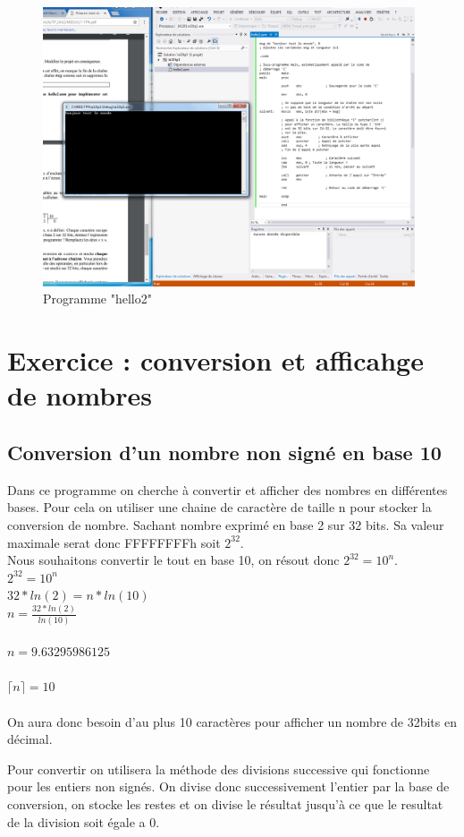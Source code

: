 \documentclass[11pt]{report}
\begin{document}
\begin{figure}[ht]
\includegraphics[width=11cm]{Capture4.PNG}
\caption{Programme "hello2"}
\end{figure}

\section{Exercice : conversion et afficahge de nombres}

\subsection{Conversion d'un nombre non signé en base 10}


Dans ce programme on cherche à convertir et afficher des nombres en différentes bases.
Pour cela on utiliser une chaine de caractère de taille n pour stocker la conversion de nombre.
Sachant nombre exprimé en base 2 sur 32 bits. Sa valeur maximale serat donc FFFFFFFFh soit $2^{32}$.
\\ Nous souhaitons convertir le tout en base 10, on résout donc $2^{32}=10^n$.
\\ $2^{32}=10^n$
\\ $32*ln(2) = n*ln(10)$
\\ $n=\frac{32*ln(2)}{ln(10)}$
\\
\\ $n=9.63295986125$
\\
\\ ${\lceil}n{\rceil}=10$
\\
\\ On aura donc besoin d'au plus 10 caractères pour afficher un nombre de 32bits en décimal.

Pour convertir on utilisera la méthode des divisions successive qui fonctionne pour les entiers non signés.
On divise donc successivement l'entier par la base de conversion,
on stocke les restes et on divise le résultat jusqu'à ce que le resultat de la division soit égale a 0.
\end{document}
